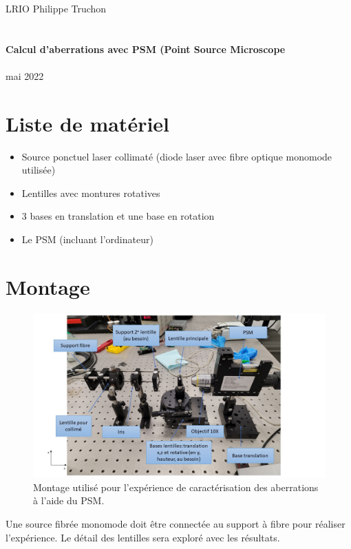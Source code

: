 \documentclass[11pt,letterpaper]{article}
\begin{document}
  	
\thispagestyle{empty} %
\begin{center}

{\large LRIO}
\hfill
{\large {Philippe Truchon}}\\


\hfill
{\large \textsc{}} \\~\\
{\Large \textbf{Calcul d'aberrations avec PSM (Point Source Microscope}}\\~\\
{\large {mai 2022}}
\end{center}
\section{Liste de matériel}
\begin{itemize}
    \item Source ponctuel laser collimaté (diode laser avec fibre optique monomode utilisée)
    \item Lentilles avec montures rotatives
    \item 3 bases en translation et une base en rotation
    \item Le PSM (incluant l'ordinateur)
\end{itemize}
\section{Montage}
\begin{figure}[H]
    \centering
    \includegraphics[scale=0.5]{montage_psm.jpg}
    \caption{Montage utilisé pour l'expérience de caractérisation des aberrations à l'aide du PSM.}
    \label{montage}
\end{figure}
Une source fibrée monomode doit être connectée au support à fibre pour réaliser l'expérience. Le détail des lentilles sera exploré avec les résultats.
\end{document}
